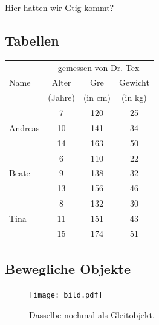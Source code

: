 \documentclass[11pt,a4paper]{article} %
\begin{document}
Hier hatten wir Gtig kommt?

\subsection{Tabellen}
\label{Tabellen}



\begin{center}
\begin{tabular}{|l||c|c|c|}
\hline
           & \multicolumn{3}{|c|}{gemessen von Dr. Tex} \\
\cline{2-4}
Name       &  Alter    & Gre   & Gewicht \\
           &  (Jahre)  & (in cm) & (in kg) \\
\hline
\hline
           &   7       &  120    &  25     \\
\cline{2-4}
Andreas    &   10      &  141    &  34     \\
\cline{2-4}
           &   14      &  163    &  50     \\
\hline
           &   6       &  110    &  22     \\
\cline{2-4}
Beate      &   9       &  138    &  32     \\
\cline{2-4}
           &   13      &  156    &  46     \\
\hline
           &   8       &  132    &  30     \\
\cline{2-4}
Tina       &   11      &  151    &  43     \\
\cline{2-4}
           &   15      &  174    &  51     \\
\hline
\end{tabular}
\end{center}

\subsection{Bewegliche Objekte}
\label{Floats}


\begin{figure}[h]
\begin{center}
\texttt{[image: bild.pdf]}
\caption{Dasselbe nochmal als Gleitobjekt. \label{bild}}
\end{center}
\end{figure}

\begin{center}


\end{center}
\end{document}
